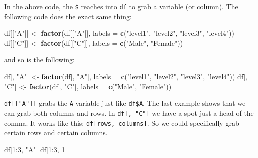 \documentclass[]{tufte-book}
\newenvironment{Shaded}{}{}
\newcommand{\KeywordTok}[1]{\textcolor[rgb]{0.00,0.44,0.13}{\textbf{#1}}}
\newcommand{\DataTypeTok}[1]{\textcolor[rgb]{0.56,0.13,0.00}{#1}}
\newcommand{\DecValTok}[1]{\textcolor[rgb]{0.25,0.63,0.44}{#1}}
\newcommand{\StringTok}[1]{\textcolor[rgb]{0.25,0.44,0.63}{#1}}
\newcommand{\OperatorTok}[1]{\textcolor[rgb]{0.40,0.40,0.40}{#1}}
\newcommand{\NormalTok}[1]{#1}
\theoremstyle{definition}
\theoremstyle{definition}
\theoremstyle{remark}
\begin{document}
In the above code, the \texttt{\$} reaches into \texttt{df} to grab a
variable (or column). The following code does the exact same thing:

\begin{Shaded}
\begin{Highlighting}[]
\NormalTok{df[[}\StringTok{"A"}\NormalTok{]] <-}\StringTok{ }\KeywordTok{factor}\NormalTok{(df[[}\StringTok{"A"}\NormalTok{]], }\DataTypeTok{labels =} \KeywordTok{c}\NormalTok{(}\StringTok{"level1"}\NormalTok{, }
    \StringTok{"level2"}\NormalTok{, }\StringTok{"level3"}\NormalTok{, }\StringTok{"level4"}\NormalTok{))}
\NormalTok{df[[}\StringTok{"C"}\NormalTok{]] <-}\StringTok{ }\KeywordTok{factor}\NormalTok{(df[[}\StringTok{"C"}\NormalTok{]], }\DataTypeTok{labels =} \KeywordTok{c}\NormalTok{(}\StringTok{"Male"}\NormalTok{, }
    \StringTok{"Female"}\NormalTok{))}
\end{Highlighting}
\end{Shaded}

and so is the following:

\begin{Shaded}
\begin{Highlighting}[]
\NormalTok{df[, }\StringTok{"A"}\NormalTok{] <-}\StringTok{ }\KeywordTok{factor}\NormalTok{(df[, }\StringTok{"A"}\NormalTok{], }\DataTypeTok{labels =} \KeywordTok{c}\NormalTok{(}\StringTok{"level1"}\NormalTok{, }
    \StringTok{"level2"}\NormalTok{, }\StringTok{"level3"}\NormalTok{, }\StringTok{"level4"}\NormalTok{))}
\NormalTok{df[, }\StringTok{"C"}\NormalTok{] <-}\StringTok{ }\KeywordTok{factor}\NormalTok{(df[, }\StringTok{"C"}\NormalTok{], }\DataTypeTok{labels =} \KeywordTok{c}\NormalTok{(}\StringTok{"Male"}\NormalTok{, }
    \StringTok{"Female"}\NormalTok{))}
\end{Highlighting}
\end{Shaded}

\texttt{df{[}{[}"A"{]}{]}} grabs the \texttt{A} variable just like
\texttt{df\$A}. The last example shows that we can grab both columns and
rows. In \texttt{df{[},\ "C"{]}} we have a spot just a head of the
comma. It works like this: \texttt{df{[}rows,\ columns{]}}. So we could
specifically grab certain rows and certain columns.

\begin{Shaded}
\begin{Highlighting}[]
\NormalTok{df[}\DecValTok{1}\OperatorTok{:}\DecValTok{3}\NormalTok{, }\StringTok{"A"}\NormalTok{]}
\NormalTok{df[}\DecValTok{1}\OperatorTok{:}\DecValTok{3}\NormalTok{, }\DecValTok{1}\NormalTok{]}
\end{Highlighting}
\end{Shaded}
\end{document}
